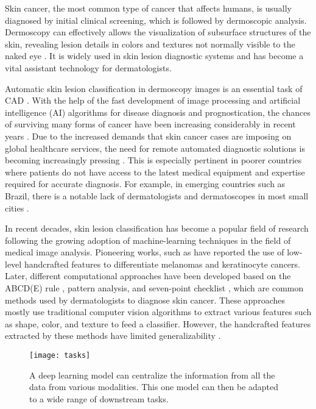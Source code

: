 Skin cancer,  the most common type of cancer that affects humans, is usually diagnosed by initial clinical screening, which is followed by dermoscopic analysis. Dermoscopy can effectively allows the visualization of subsurface structures of the skin, revealing lesion details in colors and textures not normally visible to the naked eye \cite{argenziano2001dermoscopy}. It is widely used in skin lesion diagnostic systems and has become a vital assistant technology for dermatologists. 

 Automatic skin lesion classification in dermoscopy images is an essential task of CAD \cite{tang2020gp}. With the help of the fast development of image processing and artificial intelligence (AI) algorithms for disease diagnosis and prognostication, the chances of surviving many forms of cancer have been increasing considerably in recent years \cite{iqbal2021automated}.  Due to the increased demands that skin cancer cases are imposing on global healthcare services, the need for remote automated diagnostic solutions is becoming increasingly pressing \cite{cassidy2022analysis}. This is especially pertinent in poorer countries where patients do not have access to the latest medical equipment and expertise required for accurate diagnosis. For example, in emerging countries such as Brazil, there is a notable lack of dermatologists and dermatoscopes in most small cities \cite{pacheco2020impact}. 
 
 In recent decades, skin lesion classification has become a popular field of research following the growing adoption of machine-learning techniques in the field of medical image analysis. Pioneering works, such as \cite{umbaugh1993automatic,ercal1994neural,green1994computer} have reported the use of low-level handcrafted features to differentiate melanomas and keratinocyte cancers. Later, different computational approaches have been developed based on the ABCD(E) rule \cite{rigel2005abcde}, pattern analysis, and seven-point checklist \cite{di2010automatic}, which are common methods used by dermatologists to diagnose skin cancer. These approaches mostly use traditional computer vision algorithms to extract various features such as shape, color, and texture to feed a classifier. However, the handcrafted features extracted by these methods have limited generalizability \cite{yu2016automated}.

\begin{figure}[!h]
\centering
	\texttt{[image: tasks]}
		\caption{A deep learning model can centralize the information from all the data from various modalities. This one model can then be adapted to a wide range of downstream tasks.}
		\label{Fig:tasks} 
\end{figure}
 
